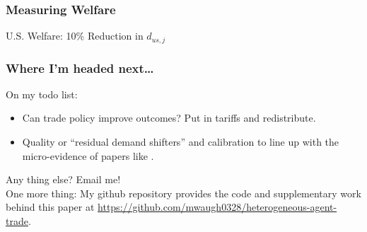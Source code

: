 \documentclass[9pt,pdftex,aspectratio=1610]{beamer}
\theoremstyle{definition}
\begin{document}
\begin{frame}[t]
\frametitle{Measuring Welfare}
\smallskip


\end{frame}


\begin{frame}[t]{U.S. Welfare: 10\% Reduction in $d_{us,j}$}
\begin{figure}[!t]
\end{figure}
\end{frame}




\begin{frame}[t]
\frametitle{Where I'm headed next\ldots}
\smallskip
On my todo list:
\begin{itemize}
\smallskip
\item Can trade policy improve outcomes? Put in tariffs and redistribute.
\smallskip
\item Quality or ``residual demand shifters'' and calibration to line up with the micro-evidence of papers like \citet{auer2022unequal}.
\end{itemize}
\medskip
Any thing else? Email me!\\
\bigskip
One more thing: My github repository provides the code and supplementary work behind this paper at \url{https://github.com/mwaugh0328/heterogeneous-agent-trade}.

\end{frame}
\end{document}

